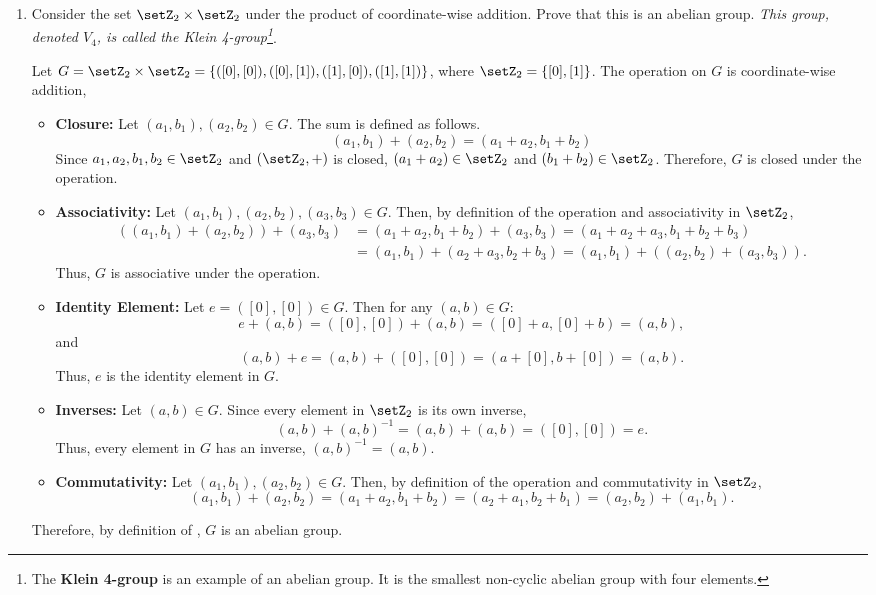 \begin{enumerate} 
  \item Consider the set $\setZ_2 \times \setZ_2$ under the product 
  of coordinate-wise addition. Prove that this is an abelian group. 
  \textit{This group, denoted $V_4$, is called the Klein 4-group\footnote{
    The \textbf{Klein 4-group} is an example of an abelian group. 
    It is the smallest non-cyclic abelian group with four elements.
  }}.
  \begin{subprove}
    Let $G = \setZ_2 \times \setZ_2 = \{([0],[0]), ([0],[1]), ([1],[0]), ([1],[1])\}$, 
    where $\setZ_2 = \{[0], [1]\}$. 
    The operation on $G$ is coordinate-wise addition, 
    \begin{itemize}
      \item \textbf{Closure:} 
        Let $(a_1, b_1),(a_2, b_2)\in G$. 
        The sum is defined as follows.
        \[
          (a_1, b_1) + (a_2, b_2) = (a_1 + a_2, b_1 + b_2)
        \]
        Since $a_1, a_2, b_1, b_2 \in \setZ_2$ and $(\setZ_2, +)$ is closed, 
        $(a_1 + a_2) \in \setZ_2$ and $(b_1 + b_2) \in \setZ_2$.
        Therefore, $G$ is closed under the operation.
      \item \textbf{Associativity:}
        Let $(a_1, b_1),(a_2, b_2),(a_3, b_3)\in G$. 
        Then, by definition of the operation and associativity in $\setZ_2$,
        \begin{align*}
          ((a_1, b_1) + (a_2, b_2)) + (a_3, b_3) 
          &= (a_1 + a_2, b_1 + b_2) + (a_3, b_3) = (a_1 + a_2 + a_3, b_1 + b_2 + b_3) \\
          &= (a_1, b_1) + (a_2 + a_3, b_2 + b_3) = (a_1, b_1) + ((a_2, b_2) + (a_3, b_3)).
        \end{align*}
        Thus, $G$ is associative under the operation.
      \item \textbf{Identity Element:}
        Let $e = ([0],[0]) \in G$. Then for any $(a, b) \in G$:
        \[
          e + (a, b) = ([0],[0]) + (a, b) = ([0] + a, [0] + b) = (a, b),
        \]
        and
        \[
          (a, b) + e = (a, b) + ([0],[0]) = (a + [0], b + [0]) = (a, b).
        \]
        Thus, $e$ is the identity element in $G$.
      \item \textbf{Inverses:}
        Let $(a, b) \in G$. Since every element in $\setZ_2$ is its own inverse,
        \[
          (a, b) + (a, b)^{-1} = (a, b) + (a, b) = ([0],[0]) = e.
        \]
        Thus, every element in $G$ has an inverse, $(a, b)^{-1}=(a, b)$.
      \item \textbf{Commutativity:}
        Let $(a_1, b_1),(a_2, b_2)\in G$. 
        Then, by definition of the operation and commutativity in $\setZ_2$,
        \[
          (a_1, b_1) + (a_2, b_2) = (a_1 + a_2, b_1 + b_2) = (a_2 + a_1, b_2 + b_1) = (a_2, b_2) + (a_1, b_1).
        \]
    \end{itemize}
    Therefore, by definition of , $G$ is an abelian group.
  \end{subprove}









\end{enumerate}
